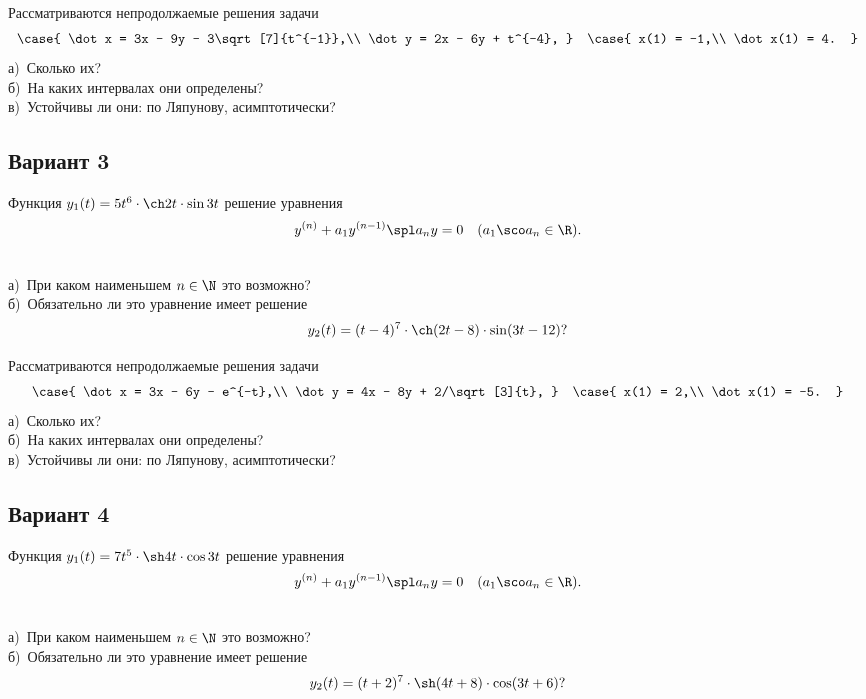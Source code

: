 \documentclass{article}
\begin{document}
\begin{problem}[2+1+3 балла]
Рассматриваются непродолжаемые решения задачи
$$
\case{
\dot x = 3x - 9y - 3\sqrt[7]{t^{-1}},\\
\dot y = 2x - 6y + t^{-4},
}
\quad
\case{
x(1) = -1,\\
\dot x(1) = 4.
}
$$
а)~Сколько их?\\
б)~На каких интервалах они определены?\\
в)~Устойчивы ли они: по Ляпунову, асимптотически?
\end{problem}


\subsection{Вариант 3}

Функция $y_1(t) = 5t^6 \cdot \ch 2t \cdot \sin 3t$ решение уравнения
$$y^{(n)} + a_1y^{(n-1)}\spl a_ny = 0\quad (a_1\sco a_n \in \R).$$
\begin{problem}[2+2 балла]\\
а)~При каком наименьшем $n \in \N$ это возможно?\\
б)~Обязательно ли это уравнение имеет решение
$$y_2(t) = (t-4)^7\cdot \ch(2t-8)\cdot \sin(3t-12)?$$
\end{problem}

\begin{problem}[2+1+3 балла]
Рассматриваются непродолжаемые решения задачи
$$
\case{
\dot x = 3x - 6y - e^{-t},\\
\dot y = 4x - 8y + 2/\sqrt[3]{t},
}
\quad
\case{
x(1) = 2,\\
\dot x(1) = -5.
}
$$
а)~Сколько их?\\
б)~На каких интервалах они определены?\\
в)~Устойчивы ли они: по Ляпунову, асимптотически?
\end{problem}

\subsection{Вариант 4}

Функция $y_1(t) = 7t^5 \cdot \sh 4t \cdot \cos 3t$ решение уравнения
$$y^{(n)} + a_1y^{(n-1)}\spl a_ny = 0\quad (a_1\sco a_n \in \R).$$
\begin{problem}[2+2 балла]\\
а)~При каком наименьшем $n \in \N$ это возможно?\\
б)~Обязательно ли это уравнение имеет решение
$$y_2(t) = (t+2)^7\cdot \sh(4t+8)\cdot \cos(3t+6)?$$
\end{problem}
\end{document}
